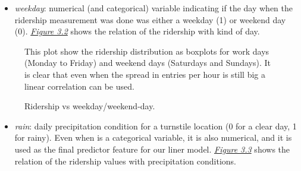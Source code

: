 \documentclass[letterpaper,10pt,english]{sphinxmanual}
\begin{document}
\begin{itemize}
\item {} 
\emph{weekday}: numerical (and categorical) variable indicating if the day
when the ridership measurement was done was either a weekday (1) or weekend
day (0). {\hyperref[section2:figure32]{\emph{Figure 3.2}}}
shows the relation of the ridership with kind of day.

\end{itemize}
\begin{figure}[htbp]
\centering
\capstart

\caption{Ridership vs weekday/weekend-day.}{\small 
This plot show the ridership distribution as boxplots for work days (Monday to
Friday) and weekend days (Saturdays and Sundays). It is clear that even
when the spread in entries per hour is still big a linear correlation can
be used.
}\label{section2:figure32}\end{figure}
\begin{itemize}
\item {} 
\emph{rain}: daily precipitation condition for a turnstile location (0 for a clear
day, 1 for rainy). Even when is a categorical variable, it is also numerical,
and it is used as the final predictor feature for our liner model.
{\hyperref[section2:figure33]{\emph{Figure 3.3}}} shows the relation of the ridership values with
precipitation conditions.

\end{itemize}
\end{document}
